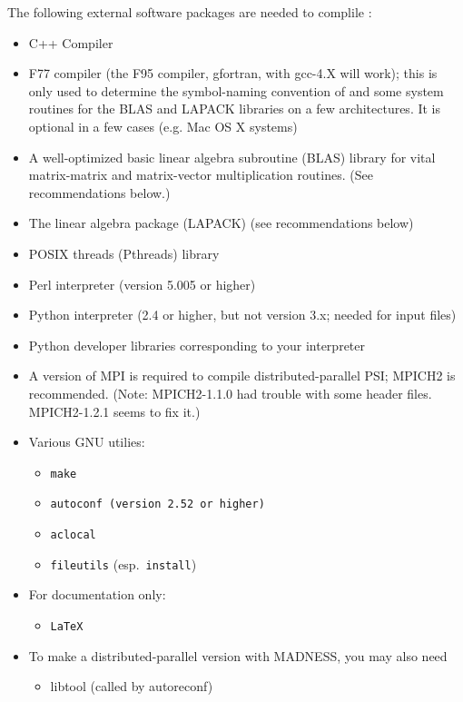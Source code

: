 \documentclass[12pt]{article}
\begin{document}
The following external software packages are needed to complile \PSIfour:
\begin{itemize}
\item C++ Compiler
\item F77 compiler (the F95 compiler, gfortran, with gcc-4.X will work);
  this is only used to determine the symbol-naming
  convention of and some system routines for the BLAS and LAPACK libraries
  on a few architectures.  It is optional in a few cases (e.g. Mac OS X
  systems)
\item A well-optimized basic linear algebra subroutine (BLAS) library
  for vital matrix-matrix and matrix-vector multiplication
  routines. (See recommendations below.)
\item The linear algebra package (LAPACK) (see recommendations below)
\item POSIX threads (Pthreads) library
\item Perl interpreter (version 5.005 or higher)
\item Python interpreter (2.4 or higher, but not version 3.x; 
      needed for input files)
\item Python developer libraries corresponding to your interpreter
\item A version of MPI is required to compile distributed-parallel PSI; 
  MPICH2 is recommended.
  (Note: MPICH2-1.1.0 had trouble with some header files.  MPICH2-1.2.1
  seems to fix it.)
\item Various GNU utilies: 
\begin{itemize}
\item {\tt make}
\item {\tt autoconf (version 2.52 or higher)}
\item {\tt aclocal}
\item {\tt fileutils} (esp.\ {\tt install})
\end{itemize}
\item For documentation only:
\begin{itemize}
\item {\tt LaTeX}
\end{itemize}
\item To make a distributed-parallel version with MADNESS, you may also
need 
\begin{itemize}
\item libtool (called by autoreconf)
\end{itemize}
\end{itemize}
\end{document}
